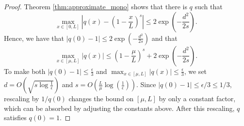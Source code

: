 \begin{proof}
Theorem \ref{thm:approximate_mono} shows that there is $q$ such
that 
\[
\max_{x\in[0,L]}\left|q(x)-\left(1-\frac{x}{L}\right)^{s}\right|\leq2\exp(-\frac{d^{2}}{2s}).
\]
Hence, we have that $\left|q(0)-1\right|\leq2\exp(-\frac{d^{2}}{2s})$
and that
\[
\max_{x\in[\mu,L]}\left|q(x)\right|\leq\left(1-\frac{\mu}{L}\right)^{s}+2\exp(-\frac{d^{2}}{2s}).
\]
To make both $|q(0)-1|\leq\frac{\epsilon}{3}$ and $\max_{x\in[\mu,L]}\left|q(x)\right|\leq\frac{\epsilon}{3}$,
we set $d=O(\sqrt{s\log\frac{1}{\epsilon}})$ and $s=O(\frac{L}{\mu}\log(\frac{1}{\epsilon}))$.
Since $|q(0)-1|\leq\epsilon/3\leq1/3$, rescaling by $1/q(0)$ changes
the bound on $[\mu,L]$ by only a constant factor, which can be absorbed
by adjusting the constants above. After this rescaling, $q$ satisfies
$q(0)=1$.%
\end{proof}

